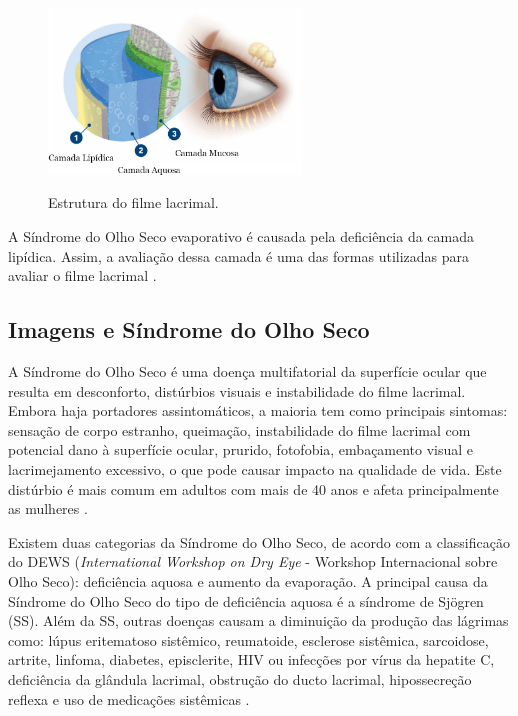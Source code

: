 \begin{figure}[!ht]
    \centering
    \caption[Estrutura do filme lacrimal.]{Estrutura do filme lacrimal.}
    \includegraphics[width=0.6\textwidth]{figs/ImagemCamadas.png}
    \label{fig:EstruturaFilmeLacrimal}
\end{figure}

A Síndrome do Olho Seco evaporativo é causada pela deficiência da camada lipídica. Assim, a avaliação dessa camada é uma das formas utilizadas para avaliar o filme lacrimal \cite{korb2002tear}.

\subsection{Imagens e Síndrome do Olho Seco}
\label{sec:imgPatologia}

A Síndrome do Olho Seco é uma doença multifatorial da superfície ocular que resulta em desconforto, distúrbios visuais e instabilidade do filme lacrimal. Embora haja portadores assintomáticos, a maioria tem como principais sintomas: sensação de corpo estranho, queimação, instabilidade do filme lacrimal com potencial dano à superfície ocular, prurido, fotofobia, embaçamento visual e lacrimejamento excessivo, o que pode causar impacto na qualidade de vida. Este distúrbio é mais comum em adultos com mais de 40 anos e afeta principalmente as mulheres \cite{valim2015current}.

Existem duas categorias da Síndrome do Olho Seco, de acordo com a classificação do DEWS (\textit{International Workshop on Dry Eye} - Workshop Internacional sobre Olho Seco): deficiência aquosa e aumento da evaporação. A principal causa da Síndrome do Olho Seco do tipo de deficiência aquosa é a síndrome de Sjögren (SS). Além da SS, outras doenças causam a diminuição da produção das lágrimas como: lúpus eritematoso sistêmico, reumatoide, esclerose sistêmica, sarcoidose, artrite, linfoma, diabetes, episclerite, HIV ou infecções por vírus da hepatite C, deficiência da glândula lacrimal, obstrução do ducto lacrimal, hipossecreção reflexa e uso de medicações sistêmicas \cite{dry2007definition, lemp2012distribution, sivaraj2007ocular, waszczykowska2013prevalence, fox1994systemic}.

